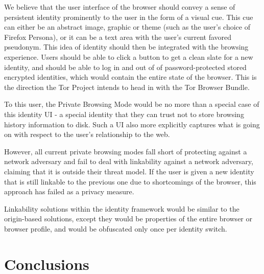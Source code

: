 \documentclass[letterpaper,11pt]{llncs}
\begin{document}
We believe that the user interface of the browser should convey a sense of
persistent identity prominently to the user in the form of a visual cue. This
cue can either be an abstract image, graphic or theme (such as the user's
choice of Firefox Persona\cite{firefox-personas}), or it can be a text area
with the user's current favored pseudonym. This idea of identity should then
be integrated with the browsing experience. Users should be able to click a
button to get a clean slate for a new identity, and should be able to log in
and out of of password-protected stored encrypted identities, which would
contain the entire state of the browser. This is the direction the Tor Project
intends to head in with the Tor Browser Bundle\cite{not-to-toggle}.

To this user, the Private Browsing Mode would be no more than a special case
of this identity UI - a special identity that they can trust not to store
browsing history information to disk. Such a UI also more explicitly captures
what is going on with respect to the user's relationship to the web.

However, all current private browsing modes fall short of protecting against a
network adversary and fail to deal with linkability against a network
adversary\cite{private-browsing}, claiming that it is outside their threat
model\footnotemark. If the user is given a new identity that is still linkable
to the previous one due to shortcomings of the browser, this approach has
failed as a privacy measure.


Linkability solutions within the identity framework would be similar to the
origin-based solutions, except they would be properties of the entire browser
or browser profile, and would be obfuscated only once per identity switch.


\section{Conclusions}
\end{document}
